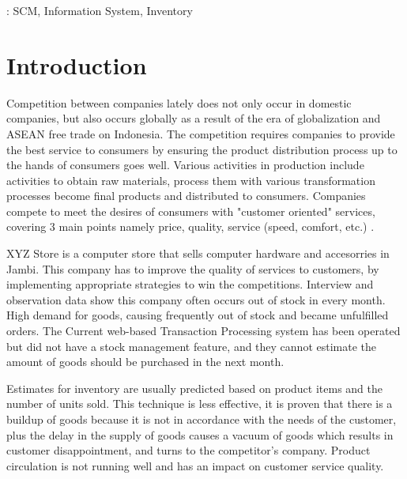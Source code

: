 \documentclass[12pt,a4paper,final]{iopart}
\begin{document}
\vspace{2pc}
: SCM, Information System, Inventory

\section{Introduction}

Competition between companies lately does not only occur in domestic companies, but also occurs globally as a result of the era of globalization and ASEAN free trade on Indonesia. The competition requires companies to provide the best service to consumers by ensuring the product distribution process up to the hands of consumers goes well. Various activities in production include activities to obtain raw materials, process them with various transformation processes become final products and distributed to consumers. Companies compete to meet the desires of consumers with "customer oriented" services, covering 3 main points namely price, quality, service (speed, comfort, etc.) \cite{Indrajit2016a}.

XYZ Store is a computer store that sells computer hardware and accesorries in Jambi. This company has to improve the quality of services to customers, by implementing appropriate strategies to win the competitions. Interview and observation data show this company often occurs out of stock in every month. High demand for goods, causing frequently out of stock and became unfulfilled orders. The Current web-based Transaction Processing system has been operated but did not have a stock management feature, and they cannot estimate the amount of goods should be purchased in the next month.

Estimates for inventory are usually predicted based on product items and the number of units sold. This technique is less effective, it is proven that there is a buildup of goods because it is not in accordance with the needs of the customer, plus the delay in the supply of goods causes a vacuum of goods which results in customer disappointment, and turns to the competitor's company. Product circulation is not running well and has an impact on customer service quality.
\end{document}
